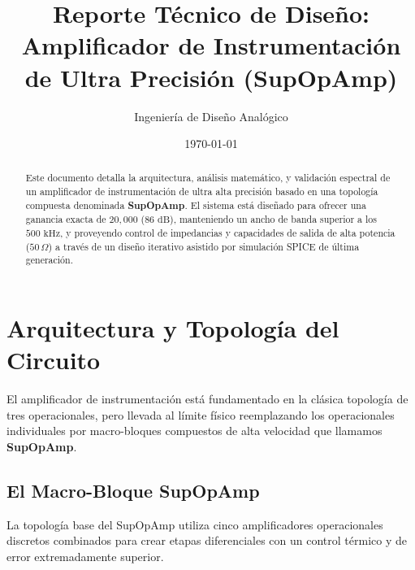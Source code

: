 \documentclass[11pt, a4paper]{article}
\title{\textbf{Reporte Técnico de Diseño: Amplificador de Instrumentación de Ultra Precisión (SupOpAmp)}}
\author{Ingeniería de Diseño Analógico}
\date{\today}
\begin{document}
\maketitle

\begin{abstract}
Este documento detalla la arquitectura, análisis matemático, y validación espectral de un amplificador de instrumentación de ultra alta precisión basado en una topología compuesta denominada \textbf{SupOpAmp}. El sistema está diseñado para ofrecer una ganancia exacta de $20,000$ ($86\text{ dB}$), manteniendo un ancho de banda superior a los $500\text{ kHz}$, y proveyendo control de impedancias y capacidades de salida de alta potencia ($50\,\Omega$) a través de un diseño iterativo asistido por simulación SPICE de última generación.
\end{abstract}

\tableofcontents
\newpage

\section{Arquitectura y Topología del Circuito}

El amplificador de instrumentación está fundamentado en la clásica topología de tres operacionales, pero llevada al límite físico reemplazando los operacionales individuales por macro-bloques compuestos de alta velocidad que llamamos \textbf{SupOpAmp}.

\subsection{El Macro-Bloque SupOpAmp}

La topología base del SupOpAmp utiliza cinco amplificadores operacionales discretos combinados para crear etapas diferenciales con un control térmico y de error extremadamente superior.
\end{document}
